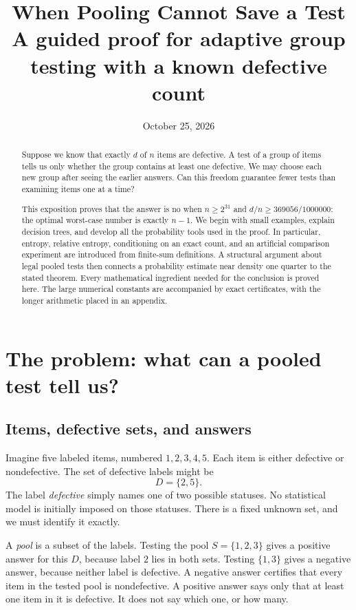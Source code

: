 \documentclass[11pt]{article}
\title{When Pooling Cannot Save a Test\\[0.4em]
\large A guided proof for adaptive group testing with a known defective count}
\author{}
\date{October 25, 2026}
\theoremstyle{definition}
\theoremstyle{remark}
\numberwithin{equation}{section}
\begin{document}
\maketitle

\begin{abstract}
Suppose we know that exactly \(d\) of \(n\) items are defective. A test
of a group of items tells us only whether the group contains at least
one defective. We may choose each new group after seeing the earlier
answers. Can this freedom guarantee fewer tests than examining items
one at a time?

This exposition proves that the answer is no when
\(n\ge2^{31}\) and \(d/n\ge369056/1000000\): the optimal worst-case
number is exactly \(n-1\). We begin with small examples, explain
decision trees, and develop all the probability tools used in the proof.
In particular, entropy, relative entropy, conditioning on an exact
count, and an artificial comparison experiment are introduced from
finite-sum definitions. A structural argument about legal pooled tests
then connects a probability estimate near density one quarter to the
stated theorem. Every mathematical ingredient needed for the conclusion
is proved here. The large numerical constants are accompanied by exact
certificates, with the longer arithmetic placed in an appendix.
\end{abstract}

\tableofcontents
\newpage

\section{The problem: what can a pooled test tell us?}\label{sec:problem}

\subsection{Items, defective sets, and answers}

Imagine five labeled items, numbered \(1,2,3,4,5\). Each item is either
defective or nondefective. The set of defective labels might be
\[
 D=\{2,5\}.
\]
The label \emph{defective} simply names one of two possible
statuses. No statistical model is initially imposed on those statuses.
There is a fixed unknown set, and we must identify it exactly.

A \emph{pool} is a subset of the labels. Testing the pool
\(S=\{1,2,3\}\) gives a positive answer for this \(D\), because label
\(2\) lies in both sets. Testing \(\{1,3\}\) gives a negative answer,
because neither label is defective. A negative answer certifies that
every item in the tested pool is nondefective. A positive answer says
only that at least one item in it is defective. It does not say which
one, or how many.
\end{document}
